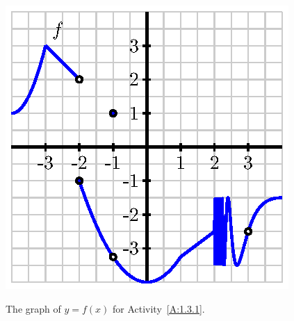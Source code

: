 \begin{marginfigure}[6cm]
\includegraphics{figures/1_7_PA1.eps}
\caption{The graph of $y = f(x)$ for Activity~\ref{A:1.3.1}.} \label{fig:1-3_A1}
\end{marginfigure}

